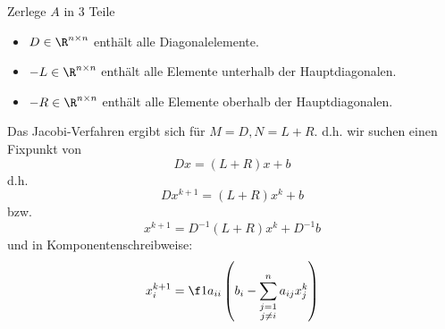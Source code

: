 \documentclass{mycourse}
\begin{document}
Zerlege $A$ in 3 Teile
\begin{itemize}
	\item
		$D\in \R^{n\times n}$ enthält alle Diagonalelemente.
	\item
		$-L\in \R^{n\times n}$ enthält alle Elemente unterhalb der Hauptdiagonalen.
	\item
		$-R \in \R^{n\times n}$ enthält alle Elemente oberhalb der Hauptdiagonalen.
\end{itemize}
Das Jacobi-Verfahren ergibt sich für $M=D, N = L + R$.
d.h. wir suchen einen Fixpunkt von
\[
	Dx = (L+R)x + b
\]
d.h.
\[
	Dx^{k+1} = (L+R)x^k +b
\]
bzw.
\[
	x^{k+1} = D^{-1}(L+R)x^k + D^{-1}b
\]
und in Komponentenschreibweise:
\[
	x_i^{k+1} = \f 1{a_{ii}}\left(b_i - \sum_{\substack{j=1\\j\neq i}}^n a_{ij} x_j^k\right)
\]
\end{document}
